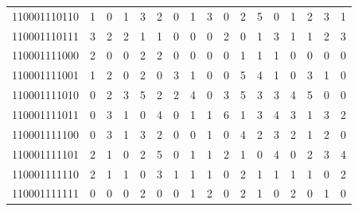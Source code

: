 \documentclass[10pt,a4paper]{article}
\begin{document}
\begin{longtable}{ |c|c|c|c|c|c|c|c|c|c|c|c|c|c|c|c|c| }
    110001110110              & 1                            & 0                                & 1                            & 3                              & 2   & 0   & 1   & 3   & 0   & 2   & 5   & 0   & 1   & 2   & 3   & 1   \\
    110001110111              & 3                            & 2                                & 2                            & 1                              & 1   & 0   & 0   & 0   & 2   & 0   & 1   & 3   & 1   & 1   & 2   & 3   \\
    110001111000              & 2                            & 0                                & 0                            & 2                              & 2   & 0   & 0   & 0   & 0   & 1   & 1   & 1   & 0   & 0   & 0   & 0   \\
    110001111001              & 1                            & 2                                & 0                            & 2                              & 0   & 3   & 1   & 0   & 0   & 5   & 4   & 1   & 0   & 3   & 1   & 0   \\
    110001111010              & 0                            & 2                                & 3                            & 5                              & 2   & 2   & 4   & 0   & 3   & 5   & 3   & 3   & 4   & 5   & 0   & 0   \\
    110001111011              & 0                            & 3                                & 1                            & 0                              & 4   & 0   & 1   & 1   & 6   & 1   & 3   & 4   & 3   & 1   & 3   & 2   \\
    110001111100              & 0                            & 3                                & 1                            & 3                              & 2   & 0   & 0   & 1   & 0   & 4   & 2   & 3   & 2   & 1   & 2   & 0   \\
    110001111101              & 2                            & 1                                & 0                            & 2                              & 5   & 0   & 1   & 1   & 2   & 1   & 0   & 4   & 0   & 2   & 3   & 4   \\
    110001111110              & 2                            & 1                                & 1                            & 0                              & 3   & 1   & 1   & 1   & 0   & 2   & 1   & 1   & 1   & 1   & 0   & 2   \\
    110001111111              & 0                            & 0                                & 0                            & 2                              & 0   & 0   & 1   & 2   & 0   & 2   & 1   & 0   & 2   & 0   & 1   & 0   \\

\end{longtable}
\end{document}
